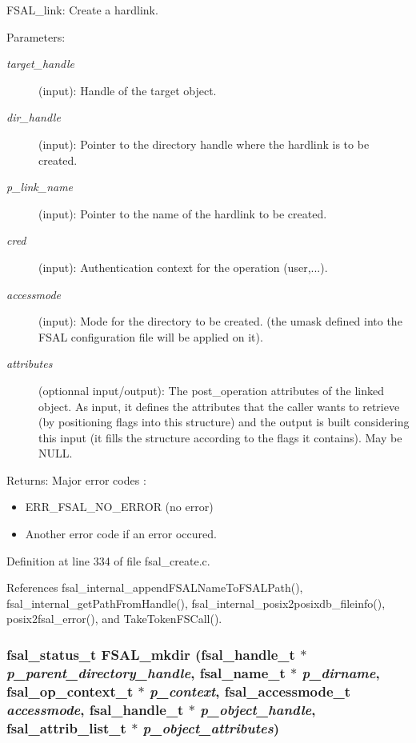 FSAL\_\-link: Create a hardlink.

\begin{Desc}
\item[Parameters:]
\begin{description}
\item[{\em target\_\-handle}](input): Handle of the target object. \item[{\em dir\_\-handle}](input): Pointer to the directory handle where the hardlink is to be created. \item[{\em p\_\-link\_\-name}](input): Pointer to the name of the hardlink to be created. \item[{\em cred}](input): Authentication context for the operation (user,...). \item[{\em accessmode}](input): Mode for the directory to be created. (the umask defined into the FSAL configuration file will be applied on it). \item[{\em attributes}](optionnal input/output): The post\_\-operation attributes of the linked object. As input, it defines the attributes that the caller wants to retrieve (by positioning flags into this structure) and the output is built considering this input (it fills the structure according to the flags it contains). May be NULL.\end{description}
\end{Desc}
\begin{Desc}
\item[Returns:]Major error codes :\begin{itemize}
\item ERR\_\-FSAL\_\-NO\_\-ERROR (no error)\item Another error code if an error occured. \end{itemize}
\end{Desc}


Definition at line 334 of file fsal\_\-create.c.

References fsal\_\-internal\_\-appendFSALNameToFSALPath(), fsal\_\-internal\_\-getPathFromHandle(), fsal\_\-internal\_\-posix2posixdb\_\-fileinfo(), posix2fsal\_\-error(), and TakeTokenFSCall().
\subsubsection[{FSAL\_\-mkdir}]{\setlength{\rightskip}{0pt plus 5cm}fsal\_\-status\_\-t FSAL\_\-mkdir (fsal\_\-handle\_\-t $\ast$ {\em p\_\-parent\_\-directory\_\-handle}, \/  fsal\_\-name\_\-t $\ast$ {\em p\_\-dirname}, \/  fsal\_\-op\_\-context\_\-t $\ast$ {\em p\_\-context}, \/  fsal\_\-accessmode\_\-t {\em accessmode}, \/  fsal\_\-handle\_\-t $\ast$ {\em p\_\-object\_\-handle}, \/  fsal\_\-attrib\_\-list\_\-t $\ast$ {\em p\_\-object\_\-attributes})}\label{fsal__create_8c_22cd141c9597760c91ca8238c1b56816}


